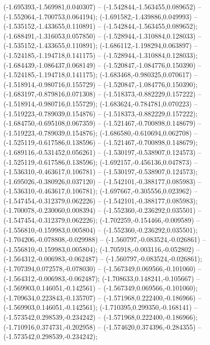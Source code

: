  (-1.695393,-1.569981,0.040307) -- (-1.542844,-1.563455,0.089652) -- (-1.552064,-1.700753,0.064194);
 (-1.691582,-1.439886,0.049993) -- (-1.535152,-1.433655,0.110891) -- (-1.542844,-1.563455,0.089652);
 (-1.688491,-1.316053,0.057850) -- (-1.528944,-1.310884,0.128033) -- (-1.535152,-1.433655,0.110891);
 (-1.686112,-1.198294,0.063897) -- (-1.524185,-1.194718,0.141175) -- (-1.528944,-1.310884,0.128033);
 (-1.684439,-1.086437,0.068149) -- (-1.520847,-1.084776,0.150390) -- (-1.524185,-1.194718,0.141175);
 (-1.683468,-0.980325,0.070617) -- (-1.518914,-0.980716,0.155729) -- (-1.520847,-1.084776,0.150390);
 (-1.683197,-0.879816,0.071308) -- (-1.518373,-0.882229,0.157222) -- (-1.518914,-0.980716,0.155729);
 (-1.683624,-0.784781,0.070223) -- (-1.519223,-0.789039,0.154876) -- (-1.518373,-0.882229,0.157222);
 (-1.684750,-0.695108,0.067359) -- (-1.521467,-0.700898,0.148679) -- (-1.519223,-0.789039,0.154876);
 (-1.686580,-0.610694,0.062708) -- (-1.525119,-0.617586,0.138596) -- (-1.521467,-0.700898,0.148679);
 (-1.689116,-0.531452,0.056261) -- (-1.530197,-0.538907,0.124573) -- (-1.525119,-0.617586,0.138596);
 (-1.692157,-0.456136,0.047873) -- (-1.536310,-0.463617,0.106781) -- (-1.530197,-0.538907,0.124573);
 (-1.695026,-0.380926,0.037120) -- (-1.542101,-0.388177,0.085983) -- (-1.536310,-0.463617,0.106781);
 (-1.697667,-0.305556,0.023962) -- (-1.547454,-0.312379,0.062226) -- (-1.542101,-0.388177,0.085983);
 (-1.700078,-0.230060,0.008394) -- (-1.552360,-0.236292,0.035501) -- (-1.547454,-0.312379,0.062226);
 (-1.702259,-0.154466,-0.009589) -- (-1.556810,-0.159983,0.005804) -- (-1.552360,-0.236292,0.035501);
 (-1.704206,-0.078808,-0.029988) -- (-1.560797,-0.083524,-0.026861) -- (-1.556810,-0.159983,0.005804);
 (-1.705918,-0.003116,-0.052802) -- (-1.564312,-0.006983,-0.062487) -- (-1.560797,-0.083524,-0.026861);
 (-1.707394,0.072578,-0.078030) -- (-1.567349,0.069566,-0.101060) -- (-1.564312,-0.006983,-0.062487);
 (-1.708633,0.148241,-0.105667) -- (-1.569903,0.146051,-0.142561) -- (-1.567349,0.069566,-0.101060);
 (-1.709634,0.223843,-0.135707) -- (-1.571968,0.222400,-0.186966) -- (-1.569903,0.146051,-0.142561);
 (-1.710395,0.299350,-0.168141) -- (-1.573542,0.298539,-0.234242) -- (-1.571968,0.222400,-0.186966);
 (-1.710916,0.374731,-0.202958) -- (-1.574620,0.374396,-0.284355) -- (-1.573542,0.298539,-0.234242);
